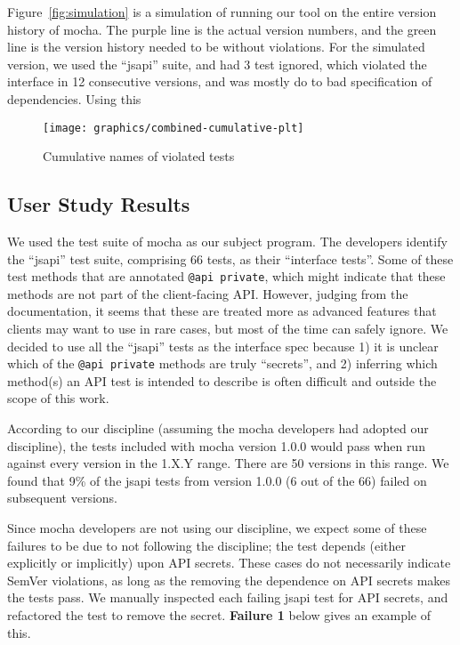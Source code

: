 Figure~\ref{fig:simulation} is a simulation of running our tool 
on the entire version history of mocha. The purple line is the 
actual version numbers, and the green line is the version history
needed to be without violations. For the simulated version, we used the
``jsapi'' suite, and had 3 test ignored, which violated the interface in 12
consecutive versions, and was mostly do to bad specification of dependencies.
Using this

\begin{figure*}
\centering
\texttt{[image: graphics/combined-cumulative-plt]}
\caption{Cumulative names of violated tests} 
\label{fig:cumulative}
\end{figure*}

\subsection{User Study Results}
We used the test suite of mocha as our subject program. The developers
identify the ``jsapi'' test suite, comprising 66 tests, as their
``interface tests''. Some of these test methods that are annotated
{\tt @api private}, which might indicate that these methods are not
part of the client-facing API\@. However, judging from the
documentation, it seems that these are treated more as advanced
features that clients may want to use in rare cases, but most of the
time can safely ignore. We decided to use all the ``jsapi'' tests as the
interface spec because 1) it is unclear which of the {\tt @api
  private} methods are truly ``secrets'', and 2) inferring which
method(s) an API test is intended to describe is often difficult and
outside the scope of this work.

According to our discipline (assuming the mocha developers had adopted
our discipline), the tests included with mocha version 1.0.0 would
pass when run against every version in the 1.X.Y range. There are 50
versions in this range. We found that 9\% of the jsapi tests from
version 1.0.0 (6 out of the 66) failed on subsequent versions.

Since mocha developers are not using our discipline, we expect some of
these failures to be due to not following the discipline; the test
depends (either explicitly or implicitly) upon API secrets. These
cases do not necessarily indicate SemVer violations, as long as the
removing the dependence on API secrets makes the tests pass. We
manually inspected each failing jsapi test for API secrets, and
refactored the test to remove the secret. {\bf Failure 1} below gives
an example of this.

